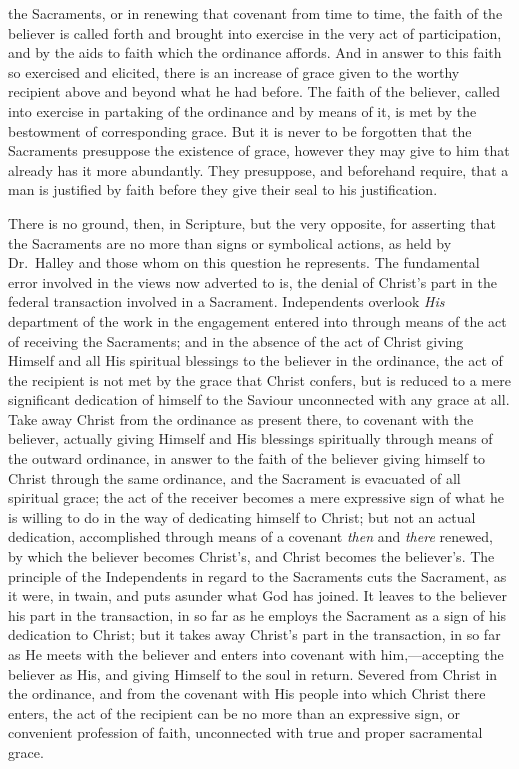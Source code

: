 \documentclass[
]{book}
\begin{document}
the Sacraments, or in renewing that covenant from time to time, the faith of the believer is called forth and brought into exercise in the very act of participation, and by the aids to faith which the ordinance affords. And in answer to this faith so exercised and elicited, there is an increase of grace given to the worthy recipient above and beyond what he had before. The faith of the believer, called into exercise in partaking of the ordinance and by means of it, is met by the bestowment of corresponding grace. But it is never to be forgotten that the Sacraments presuppose the existence of grace, however they may give to him that already has it more abundantly. They presuppose, and beforehand require, that a man is justified by faith before they give their seal to his justification.

There is no ground, then, in Scripture, but the very opposite, for asserting that the Sacraments are no more than signs or symbolical actions, as held by Dr.~Halley and those whom on this question he represents. The fundamental error involved in the views now adverted to is, the denial of Christ's part in the federal transaction involved in a Sacrament. Independents overlook \emph{His} department of the work in the engagement entered into through means of the act of receiving the Sacraments; and in the absence of the act of Christ giving Himself and all His spiritual blessings to the believer in the ordinance, the act of the recipient is not met by the grace that Christ confers, but is reduced to a mere significant dedication of himself to the Saviour unconnected with any grace at all. Take away Christ from the ordinance as present there, to covenant with the believer, actually giving Himself and His blessings spiritually through means of the outward ordinance, in answer to the faith of the believer giving himself to Christ through the same ordinance, and the Sacrament is evacuated of all spiritual grace; the act of the receiver becomes a mere expressive sign of what he is willing to do in the way of dedicating himself to Christ; but not an actual dedication, accomplished through means of a covenant \emph{then} and \emph{there} renewed, by which the believer becomes Christ's, and Christ becomes the believer's. The principle of the Independents in regard to the Sacraments cuts the Sacrament, as it were, in twain, and puts asunder what God has joined. It leaves to the believer his part in the transaction, in so far as he employs the Sacrament as a sign of his dedication to Christ; but it takes away Christ's part in the transaction, in so far as He meets with the believer and enters into covenant with him,---accepting the believer as His, and giving Himself to the soul in return. Severed from Christ in the ordinance, and from the covenant with His people into which Christ there enters, the act of the recipient can be no more than an expressive sign, or convenient profession of faith, unconnected with true and proper sacramental grace.
\end{document}
